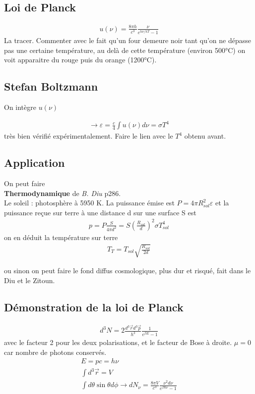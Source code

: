 \documentclass[12pt,prb,aps,epsf]{article}
\begin{document}
\subsection{Loi de Planck}
\begin{eqnarray}
u(\nu) = \frac{8\pi h}{c^3}\frac{\nu}{e^{h\nu/kT}-1}
\end{eqnarray}
La tracer. Commenter avec le fait qu'un four demeure noir tant qu'on ne dépasse pas une certaine température, au delà de cette température (environ 500°C) on voit apparaitre du rouge puis du orange (1200°C).

\subsection{Stefan Boltzmann}
On intègre $u(\nu)$ 

\begin{eqnarray}
\longrightarrow \varepsilon = \frac{c}{4} \int u(\nu) d\nu = \sigma T^4
\end{eqnarray}
très bien vérifié expérimentalement. Faire le lien avec le $T^4$ obtenu avant.

\subsection{Application}
On peut faire \\

\textbf{Thermodynamique} de \textit{B. Diu} p286.\\
Le soleil : photosphère à 5950 K. La puissance émise est $P = 4\pi R_{sol}^2\varepsilon$ et la puissance reçue sur terre à une distance d sur une surface S est 
\begin{eqnarray}
p = P\frac{S}{4\pi d^2} = S\left(\frac{R_{sol}}{d}\right)^2 \sigma T_{sol} ^4
\end{eqnarray}
on en déduit la température sur terre 
\begin{eqnarray}
T_T = T_{sol}\sqrt{\frac{R_{sol}}{2d}}
\end{eqnarray}	

ou sinon on peut faire le fond diffus cosmologique, plus dur et risqué, fait dans le Diu et le Zitoun.

\subsection{Démonstration de la loi de Planck}
\begin{eqnarray}
d^3N = 2\frac{d^3\vec{r}d^3\vec{p}}{h^3}\frac{1}{e^{\beta E}-1}
\end{eqnarray}
avec le facteur 2 pour les deux polarisations, et le facteur de Bose à droite. $\mu=0$ car nombre de photons conservés. 
\begin{eqnarray}
E = pc = h\nu\\
\int d^3\vec{r} = V\\
\int d\theta \sin\theta d\phi \rightarrow dN_{\nu} = \frac{8\pi V}{c^3}\frac{\nu^2d\nu}{e^{\beta\hbar\nu}-1}
\end{eqnarray}
\end{document}
